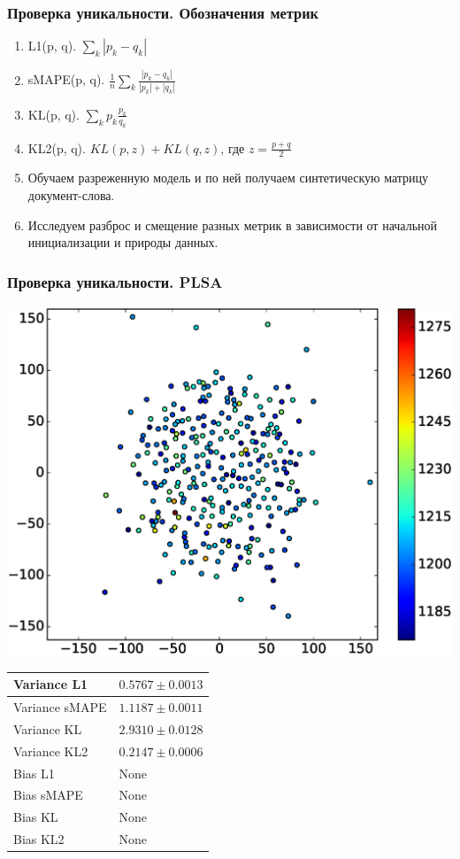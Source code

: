 \documentclass[utf8]{beamer}
\begin{document}
	\begin{frame}	
	\frametitle{Проверка уникальности. Обозначения метрик}
	\begin{enumerate}
\item L1(p, q). $\sum_k |p_k - q_k|$
\item sMAPE(p, q). $\frac1n \sum_k \frac{|p_k - q_k|}{|p_k| + |q_k|}$
\item KL(p, q). $\sum_k p_k \frac{p_k}{q_k}$
\item KL2(p, q). $KL(p, z) + KL(q, z)$, где $z = \frac{p + q}{2}$
\item Обучаем разреженную модель и по ней получаем синтетическую матрицу документ-слова. 
\item Исследуем разброс и смещение разных метрик в зависимости от начальной инициализации и природы данных.
\end{enumerate}
	\end{frame}
	
	\begin{frame}	
	\fontsize{8pt}{15.0}\selectfont
	\frametitle{Проверка уникальности. PLSA}
	 \includegraphics[width=0.45\linewidth]{presentation_pictures/plsa.eps} 
    \begin{tabular}[b]{| l | l | }\hline
      Variance L1 & $0.5767 \pm 0.0013$ \\ \hline
      Variance sMAPE  & $1.1187 \pm  0.0011$ \\ \hline
      Variance KL  & $2.9310 \pm 0.0128$ \\ \hline
      Variance KL2  & $0.2147 \pm 0.0006$ \\ \hline

      Bias L1 & None \\ \hline
      Bias sMAPE  & None \\ \hline
      Bias KL  & None \\ \hline
      Bias KL2  & None \\ \hline
    \end{tabular}

	\end{frame}
	
\end{document}
